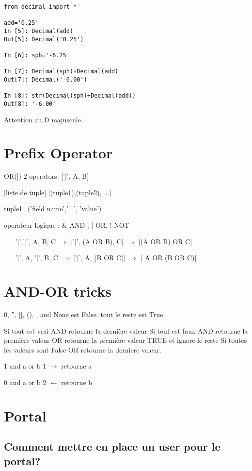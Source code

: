 \documentclass[12pt,a4paper]{article}
\begin{document}
\begin{verbatim}
from decimal import *

add='0.25'
In [5]: Decimal(add)
Out[5]: Decimal('0.25')

In [6]: sph='-6.25'

In [7]: Decimal(sph)+Decimal(add)
Out[7]: Decimal('-6.00')

In [8]: str(Decimal(sph)+Decimal(add))
Out[8]: '-6.00'
\end{verbatim}


Attention au D majuscule. 

\section{Prefix Operator}
\label{sec:prefix_op}

OR(|) 2 operators: ['|', A, B]

[liste de tuple] [(tuple1),(tuple2), ...]

tuple1=('field name','=', 'value')

operateur logique : \& AND , | OR, ! NOT  

\begin{enumerate}
\item ['|','|', A, B, C] $\Longrightarrow$ ['|', (A OR B), C] $\Longrightarrow$ [(A OR B) OR C]
\item ['|', A, '|', B, C] $\Longrightarrow$ ['|', A, (B OR C)] $\Longrightarrow$ [ A OR (B OR C)]
\end{enumerate}

\section{AND-OR tricks}
\label{sec:andor}

0, '', [], (), {}, and None est False.
tout le reste est True

Si tout est vrai AND retourne la dernière valeur
Si tout est faux AND retourne la première valeur
OR retourne la première valeur TRUE et ignore le reste
Si toutes les valeurs sont False OR retourne la derniere valeur.

1 and a or b 1 $\rightarrow$ retourne a 

0 and a or b 2 $\leftarrow$ retourne b 


\section{Portal}
\label{sec:portal}

\subsection{Comment mettre en place un user pour le portal?}
\label{sec:portal_user}
\end{document}
